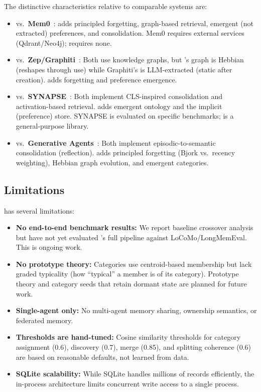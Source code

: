 The distinctive characteristics relative to comparable systems are:
\begin{itemize}[nosep]
    \item vs.\ \textbf{Mem0}~\cite{choudhary2025mem0}: \alaya{} adds
    principled forgetting, graph-based retrieval, emergent (not extracted)
    preferences, and consolidation. Mem0 requires external services
    (Qdrant/Neo4j); \alaya{} requires none.
    \item vs.\ \textbf{Zep/Graphiti}~\cite{dempsey2025graphiti}: Both use
    knowledge graphs, but \alaya{}'s graph is Hebbian (reshapes through use)
    while Graphiti's is LLM-extracted (static after creation). \alaya{} adds
    forgetting and preference emergence.
    \item vs.\ \textbf{SYNAPSE}~\cite{jiang2026synapse}: Both implement
    CLS-inspired consolidation and activation-based retrieval. \alaya{} adds
    emergent ontology and the implicit (preference) store. SYNAPSE is
    evaluated on specific benchmarks; \alaya{} is a general-purpose library.
    \item vs.\ \textbf{Generative Agents}~\cite{park2023generative}: Both
    implement episodic-to-semantic consolidation (reflection). \alaya{} adds
    principled forgetting (Bjork vs.\ recency weighting), Hebbian graph
    evolution, and emergent categories.
\end{itemize}

\subsection{Limitations}

\alaya{} has several limitations:
\begin{itemize}[nosep]
    \item \textbf{No end-to-end benchmark results:} We report baseline
    crossover analysis but have not yet evaluated \alaya{}'s full pipeline
    against LoCoMo/LongMemEval. This is ongoing work.
    \item \textbf{No prototype theory:} Categories use centroid-based
    membership but lack graded typicality (how ``typical'' a member is of
    its category). Prototype theory and category seeds that retain dormant
    state are planned for future work.
    \item \textbf{Single-agent only:} No multi-agent memory sharing,
    ownership semantics, or federated memory.
    \item \textbf{Thresholds are hand-tuned:} Cosine similarity thresholds
    for category assignment (0.6), discovery (0.7), merge (0.85), and
    splitting coherence (0.6) are based on reasonable defaults, not learned
    from data.
    \item \textbf{SQLite scalability:} While SQLite handles millions of
    records efficiently, the in-process architecture limits concurrent write
    access to a single process.
\end{itemize}
